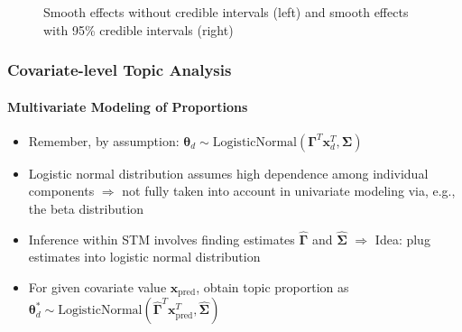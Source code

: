 \documentclass[xcolor=dvipsnames]{beamer}
\begin{document}
\begin{frame}
\begin{figure}[h!]
\begin{subfigure}[b]{0.4\linewidth}
  \end{subfigure}
  \caption{Smooth effects without credible intervals (left) and smooth effects with 95\% credible intervals (right)}
  \label{fig:directassessment}
\end{figure}
\end{frame}

\begin{frame}
\frametitle{Covariate-level Topic Analysis}
\framesubtitle{Multivariate Modeling of Proportions}
\begin{itemize}
\item Remember, by assumption: $\boldsymbol{\theta}_d \sim \text{LogisticNormal}(\boldsymbol{\Gamma}^T\boldsymbol{x}_d^T, \boldsymbol{\Sigma})$
\item Logistic normal distribution assumes high dependence among individual components $\Rightarrow$ not fully taken into account in univariate modeling via, e.g., the beta distribution
\item Inference within STM involves finding estimates $\hat{\boldsymbol{\Gamma}}$ and $\hat{\boldsymbol{\Sigma}}$ $\Rightarrow$ Idea: plug estimates into logistic normal distribution
\item For given covariate value $\boldsymbol{x}_{\text{pred}}$, obtain topic proportion as $\boldsymbol{\theta}^*_d \sim \text{LogisticNormal}(\hat{\boldsymbol{\Gamma}}^T\boldsymbol{x}_{\text{pred}}^T, \hat{\boldsymbol{\Sigma}})$
\end{itemize}
\end{frame}
\end{document}
